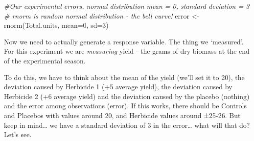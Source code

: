 \documentclass[
]{book}
\newenvironment{Shaded}{\begin{snugshade}}{\end{snugshade}}
\newcommand{\AttributeTok}[1]{\textcolor[rgb]{0.77,0.63,0.00}{#1}}
\newcommand{\CommentTok}[1]{\textcolor[rgb]{0.56,0.35,0.01}{\textit{#1}}}
\newcommand{\DecValTok}[1]{\textcolor[rgb]{0.00,0.00,0.81}{#1}}
\newcommand{\FunctionTok}[1]{\textcolor[rgb]{0.00,0.00,0.00}{#1}}
\newcommand{\NormalTok}[1]{#1}
\newcommand{\OtherTok}[1]{\textcolor[rgb]{0.56,0.35,0.01}{#1}}
\newcommand{\SpecialCharTok}[1]{\textcolor[rgb]{0.00,0.00,0.00}{#1}}
\newcommand{\StringTok}[1]{\textcolor[rgb]{0.31,0.60,0.02}{#1}}
\begin{document}
\begin{Shaded}
\begin{Highlighting}[]
\CommentTok{\#Our experimental errors, normal distribution mean = 0, standard deviation = 3}
\CommentTok{\# rnorm is random normal distribution {-} the bell curve!}
\NormalTok{error }\OtherTok{\textless{}{-}} \FunctionTok{rnorm}\NormalTok{(Total.units, }\AttributeTok{mean=}\DecValTok{0}\NormalTok{, }\AttributeTok{sd=}\DecValTok{3}\NormalTok{)}
\end{Highlighting}
\end{Shaded}

Now we need to actually generate a response variable. The thing we `measured'. For this experiment we are \emph{measuring} yield - the grams of dry biomass at the end of the experimental season.

To do this, we have to think about the mean of the yield (we'll set it to 20), the deviation caused by Herbicide 1 (+5 average yield), the deviation caused by Herbicide 2 (+6 average yield) and the deviation caused by the placebo (nothing) and the error among observations (error). If this works, there should be Controls and Placebos with values around 20, and Herbicide values around ±25-26. But keep in mind\ldots{} we have a standard deviation of 3 in the error\ldots{} what will that do? Let's see.

\begin{Shaded}
\end{Shaded}
\end{document}
